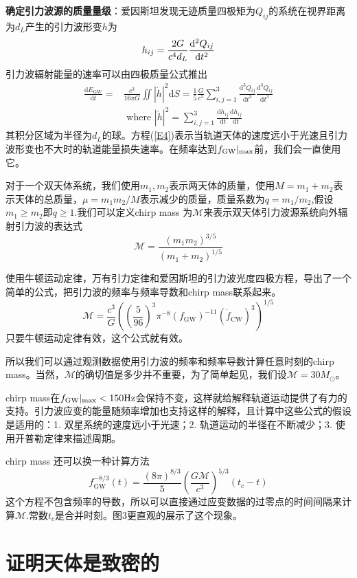 \documentclass[UTF8]{ctexart}
\begin{document}
\textbf{确定引力波源的质量量级}：爱因斯坦发现无迹质量四极矩为$Q_{ij}$的系统在视界距离为$d_L$产生的引力波形变$h$为
\begin{equation}
h_{ij}=\frac{2G}{c^4d_L}\frac{{\rm d^2}Q_{ij}}{{\rm d}t^2}
\end{equation}
引力波辐射能量的速率可以由四极质量公式推出
\begin{equation}
\label{E4}
\begin{aligned} \frac{\mathrm{d} E_{\mathrm{GW}}}{\mathrm{d} t}=& \frac{c^{3}}{16 \pi G} \iint|\dot{h}|^{2} \mathrm{d} S=\frac{1}{5} \frac{G}{c^{5}} \sum_{i, j=1}^{3} \frac{\mathrm{d}^{3} Q_{i j}}{\mathrm{d} t^{3}} \frac{\mathrm{d}^{3} Q_{i j}}{\mathrm{d} t^{3}} \\ & \text { where }|\dot{h}|^{2}=\sum_{i, j=1}^{3} \frac{\mathrm{d} h_{i j}}{\mathrm{d} t} \frac{\mathrm{d} h_{i j}}{\mathrm{d} t} \end{aligned}
\end{equation}
其积分区域为半径为$d_L$的球。方程(\ref{E4})表示当轨道天体的速度远小于光速且引力波形变也不大时的轨道能量损失速率。在频率达到$f_{\rm GW}|_{\rm max}$前，我们会一直使用它。

对于一个双天体系统，我们使用$m_1, m_2$表示两天体的质量，使用$M=m_1+m_2$表示天体的总质量，$\mu = m_1m_2/M$表示减少的质量，质量系数为$q=m_1/m_2$,假设$m_1\geq m_2$即$q\geq 1$.我们可以定义chirp mass 为$\mathscr{M}$来表示双天体引力波源系统向外辐射引力波的表达式
\begin{equation}
\mathscr{M} = \frac{(m_1m_2)^{3/5}}{(m_1+m_2)^{1/5}}
\end{equation}

使用牛顿运动定律，万有引力定律和爱因斯坦的引力波光度四极方程，导出了一个简单的公式，把引力波的频率与频率导数和chirp mass联系起来。
\begin{equation}
\label{E6}
\mathscr{M}=\frac{c^{3}}{G}\left(\left(\frac{5}{96}\right)^{3} \pi^{-8}\left(f_{\mathrm{GW}}\right)^{-11}\left(\dot{f}_{\mathrm{CW}}\right)^{3}\right)^{1 / 5}
\end{equation}
只要牛顿运动定律有效，这个公式就有效。

所以我们可以通过观测数据使用引力波的频率和频率导数计算任意时刻的chirp mass。当然，$\mathscr{M}$的确切值是多少并不重要，为了简单起见，我们设$\mathscr{M}=30M_\odot$。

chirp mass在$f_{\rm GW}|_{\rm max}<150{\rm Hz}$会保持不变，这样就给解释轨道运动提供了有力的支持。引力波应变的能量随频率增加也支持这样的解释，且计算中这些公式的假设是适用的：1. 双星系统的速度远小于光速；2. 轨道运动的半径在不断减少；3. 使用开普勒定律来描述周期。

chirp mass 还可以换一种计算方法
\begin{equation}
f_{\mathrm{GW}}^{-8 / 3}(t)=\frac{(8 \pi)^{8 / 3}}{5}\left(\frac{G \mathscr{M}}{c^{3}}\right)^{5 / 3}\left(t_{c}-t\right)
\end{equation}
这个方程不包含频率的导数，所以可以直接通过应变数据的过零点的时间间隔来计算$\mathscr{M}$.常数$t_c$是合并时刻。图3更直观的展示了这个现象。

\section{证明天体是致密的}
\end{document}
